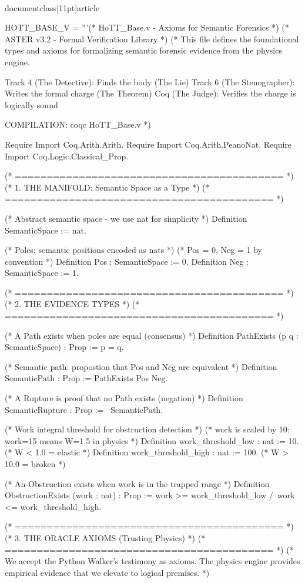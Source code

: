 \\documentclass[11pt]{article}
\begin{document}
\begin{CodeBlock}
HOTT_BASE_V = '''(* HoTT_Base.v - Axioms for Semantic Forensics *)
(* ASTER v3.2 - Formal Verification Library *)
(*
   This file defines the foundational types and axioms for
   formalizing semantic forensic evidence from the physics engine.

   Track 4 (The Detective): Finds the body (The Lie)
   Track 6 (The Stenographer): Writes the formal charge (The Theorem)
   Coq (The Judge): Verifies the charge is logically sound

   COMPILATION: coqc HoTT_Base.v
*)

Require Import Coq.Arith.Arith.
Require Import Coq.Arith.PeanoNat.
Require Import Coq.Logic.Classical_Prop.

(* ========================================== *)
(* 1. THE MANIFOLD: Semantic Space as a Type *)
(* ========================================== *)

(* Abstract semantic space - we use nat for simplicity *)
Definition SemanticSpace := nat.

(* Poles: semantic positions encoded as nats *)
(* Pos = 0, Neg = 1 by convention *)
Definition Pos : SemanticSpace := 0.
Definition Neg : SemanticSpace := 1.

(* ========================================== *)
(* 2. THE EVIDENCE TYPES *)
(* ========================================== *)

(* A Path exists when poles are equal (consensus) *)
Definition PathExists (p q : SemanticSpace) : Prop := p = q.

(* Semantic path: propostion that Pos and Neg are equivalent *)
Definition SemanticPath : Prop := PathExists Pos Neg.

(* A Rupture is proof that no Path exists (negation) *)
Definition SemanticRupture : Prop := ~SemanticPath.

(* Work integral threshold for obstruction detection *)
(* work is scaled by 10: work=15 means W=1.5 in physics *)
Definition work_threshold_low : nat := 10.   (* W < 1.0 = elastic *)
Definition work_threshold_high : nat := 100. (* W > 10.0 = broken *)

(* An Obstruction exists when work is in the trapped range *)
Definition ObstructionExists (work : nat) : Prop :=
  work >= work_threshold_low /\ work <= work_threshold_high.

(* ========================================== *)
(* 3. THE ORACLE AXIOMS (Trusting Physics) *)
(* ========================================== *)
(* We accept the Python Walker's testimony as axioms.
   The physics engine provides empirical evidence that
   we elevate to logical premises. *)


\end{CodeBlock}
\end{document}
